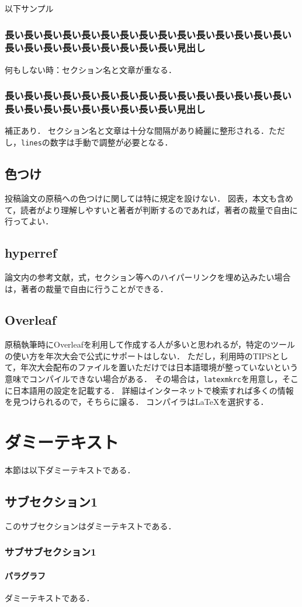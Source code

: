 \documentclass[
  platex, dvipdfmx,  %
]{nlp2024}
\newcommand{\code}[1]{\texttt{#1}}
\begin{document}
以下サンプル

\subsubsection{長い長い長い長い長い長い長い長い長い長い長い長い長い長い長い長い長い長い長い長い長い長い長い長い見出し}

何もしない時：セクション名と文章が重なる．


\subsubsection{長い長い長い長い長い長い長い長い長い長い長い長い長い長い長い長い長い長い長い長い長い長い長い長い見出し}
\restoresection

補正あり．
セクション名と文章は十分な間隔があり綺麗に整形される．ただし，\code{lines}の数字は手動で調整が必要となる．


\subsection{色つけ}
投稿論文の原稿への色つけに関しては特に規定を設けない．
図表，本文も含めて，読者がより理解しやすいと著者が判断するのであれば，著者の裁量で自由に行ってよい．

\subsection{hyperref}
論文内の参考文献，式，セクション等へのハイパーリンクを埋め込みたい場合は，著者の裁量で自由に行うことができる．


\subsection{Overleaf}
原稿執筆時にOverleafを利用して作成する人が多いと思われるが，特定のツールの使い方を年次大会で公式にサポートはしない．
ただし，利用時のTIPSとして，年次大会配布のファイルを置いただけでは日本語環境が整っていないという意味でコンパイルできない場合がある．
その場合は，\code{latexmkrc}を用意し，そこに日本語用の設定を記載する．
詳細はインターネットで検索すれば多くの情報を見つけられるので，そちらに譲る．
コンパイラはLaTeXを選択する．

\section{ダミーテキスト}
本節は以下ダミーテキストである．

\subsection{サブセクション1}
このサブセクションはダミーテキストである．

\subsubsection{サブサブセクション1}

\paragraph{パラグラフ}
ダミーテキストである．
\end{document}
